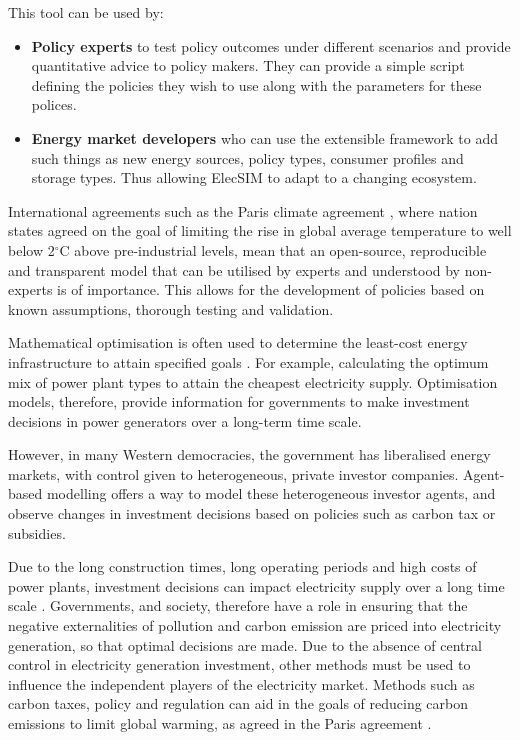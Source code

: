 This tool can be used by:
\begin{itemize}
	\item {\bf Policy experts} to test policy outcomes under different scenarios and provide quantitative advice to policy makers. They can provide a simple script defining the policies they wish to use along with the parameters for these polices.
	\item {\bf Energy market developers} who can use the extensible framework to add such things as new energy sources, policy types, consumer profiles and storage types. Thus allowing ElecSIM to adapt to a changing ecosystem.
\end{itemize}
International agreements such as the Paris climate agreement \cite{May2002}, where nation states agreed on the goal of limiting the rise in global average temperature to well below 2$^\circ$C above pre-industrial levels, mean that an open-source, reproducible and transparent model that can be utilised by experts and understood by non-experts is of importance. This allows for the development of policies based on known assumptions, thorough testing and validation.

Mathematical optimisation is often used to determine the least-cost energy infrastructure to attain specified goals \cite{Papadelis2012}. For example, calculating the optimum mix of power plant types to attain the cheapest electricity supply. Optimisation models, therefore, provide information for governments to make investment decisions in power generators over a long-term time scale. 

However, in many Western democracies, the government has liberalised energy markets, with control given to heterogeneous, private investor companies. Agent-based modelling offers a way to model these heterogeneous investor agents, and observe changes in investment decisions based on policies such as carbon tax or subsidies.

Due to the long construction times, long operating periods and high costs of power plants, investment decisions can impact electricity supply over a long time scale \cite{Chappin2017}. Governments, and society, therefore have a role in ensuring that the negative externalities of pollution and carbon emission are priced into electricity generation, so that optimal decisions are made. Due to the absence of central control in electricity generation investment, other methods must be used to influence the independent players of the electricity market. Methods such as carbon taxes, policy and regulation can aid in the goals of reducing carbon emissions to limit global warming, as agreed in the Paris agreement \cite{May2002}.

